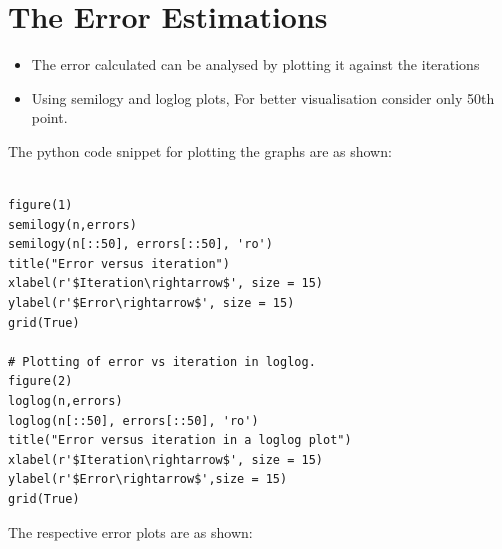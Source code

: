 \documentclass[11pt, a4paper]{article}
\begin{document}
 \section{The Error Estimations}  
 \begin{itemize}
 \item
 The error calculated can be analysed by plotting it against the iterations
 \item
 Using semilogy and loglog plots, For better visualisation consider only 50th point.
 \end{itemize}
\newpage 
 
The python code snippet for plotting the graphs are as shown:
 \begin{verbatim}
 
figure(1)
semilogy(n,errors)
semilogy(n[::50], errors[::50], 'ro')
title("Error versus iteration")
xlabel(r'$Iteration\rightarrow$', size = 15)
ylabel(r'$Error\rightarrow$', size = 15)
grid(True)

# Plotting of error vs iteration in loglog.
figure(2)
loglog(n,errors)
loglog(n[::50], errors[::50], 'ro')
title("Error versus iteration in a loglog plot")
xlabel(r'$Iteration\rightarrow$', size = 15)
ylabel(r'$Error\rightarrow$',size = 15)
grid(True)
\end{verbatim}       
\newpage
The respective error plots are as shown:
\end{document}
